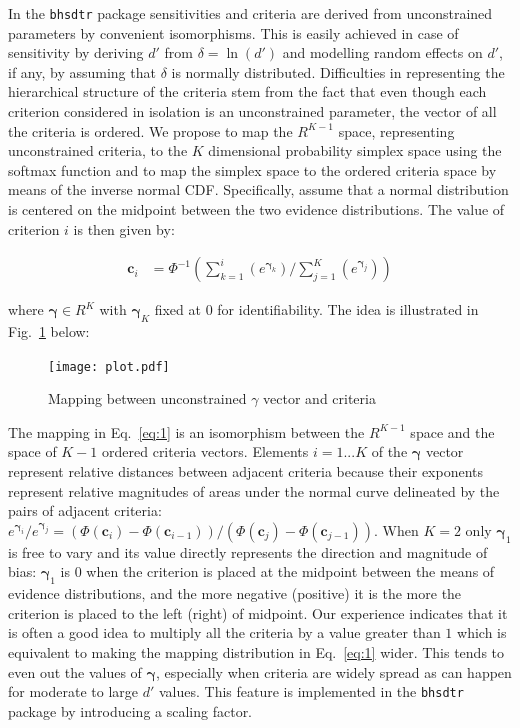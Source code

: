 \documentclass[oneside,a4paper]{article}
\begin{document}
In the \texttt{bhsdtr} package sensitivities and criteria are derived
from unconstrained parameters by convenient isomorphisms. This is
easily achieved in case of sensitivity by deriving $d'$ from
$\delta = \ln(d')$ and modelling random effects on $d'$, if any, by
assuming that $\delta$ is normally distributed. Difficulties in
representing the hierarchical structure of the criteria stem from the
fact that even though each criterion considered in isolation is an
unconstrained parameter, the vector of all the criteria is ordered.
We propose to map the $R^{K-1}$ space, representing unconstrained
criteria, to the $K$ dimensional probability simplex space using the
softmax function and to map the simplex space to the ordered criteria
space by means of the inverse normal CDF. Specifically, assume that a
normal distribution is centered on the midpoint between the two
evidence distributions. The value of criterion $i$ is then given by:

\begin{align}
  \bm{c}_i &= \Phi^{-1}(\sum_{k = 1}^i(e^{\bm{\gamma}_k}) / \sum_{j=1}^K(e^{\bm{\gamma}_j}))
\label{eq:1}
\end{align}

\noindent where $\bm{\gamma} \in R^K$ with $\bm{\gamma}_K$ fixed at
$0$ for identifiability. The idea is illustrated in
Fig.~\ref{fig:2} below:

\begin{figure}[H]
  \centering
  \texttt{[image: plot.pdf]}
  \caption{Mapping between unconstrained $\gamma$ vector and criteria}
  \label{fig:2}
\end{figure}

The mapping in Eq.~\ref{eq:1} is an isomorphism between the $R^{K-1}$
space and the space of $K-1$ ordered criteria vectors. Elements
$i = 1...K$ of the $\bm{\gamma}$ vector represent relative distances
between adjacent criteria because their exponents represent relative
magnitudes of areas under the normal curve delineated by the pairs of
adjacent criteria:
$e^{\bm{\gamma}_i} / e^{\bm{\gamma}_j} = (\Phi(\bm{c}_i) -
\Phi(\bm{c}_{i-1})) / (\Phi(\bm{c}_j) - \Phi(\bm{c}_{j-1}))$.
When $K=2$ only $\bm{\gamma}_1$ is free to vary and its value directly
represents the direction and magnitude of bias: $\bm{\gamma}_1$ is $0$
when the criterion is placed at the midpoint between the means of
evidence distributions, and the more negative (positive) it is the
more the criterion is placed to the left (right) of midpoint. Our
experience indicates that it is often a good idea to multiply all the
criteria by a value greater than $1$ which is equivalent to making the
mapping distribution in Eq.~\ref{eq:1} wider. This tends to even out
the values of $\bm{\gamma}$, especially when criteria are widely
spread as can happen for moderate to large $d'$ values. This feature
is implemented in the \texttt{bhsdtr} package by introducing a scaling
factor.
\end{document}
